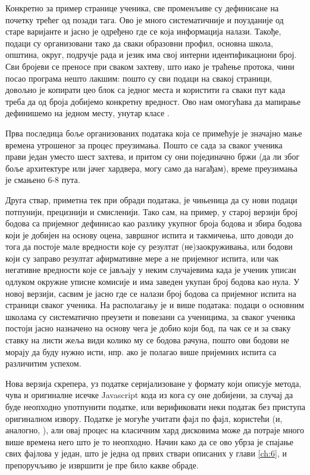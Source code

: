 Конкретно за пример странице ученика, све променљиве су дефинисане на почетку трећег од позади  тага. Ово је много систематичније и поузданије од старе варијанте и јасно је одређено где се која информација налази. Такође, подаци су организовани тако да сваки образовни профил, основна школа, општина, округ, подручје рада и језик има свој интерни идентификациони број. Сви бројеви се преносе при сваком захтеву, што иако је траћење протока, чини посао програма нешто лакшим: пошто су сви подаци на свакој страници, довољно је копирати цео блок са једног места и користити га сваки пут када треба да од броја добијемо конкретну вредност. Ово нам омогућава да мапирање дефинишемо на једном месту, унутар класе .

Прва последица боље организованих података која се примећује је значајно мање времена утрошеног за процес преузимања. Пошто се сада за сваког ученика прави један уместо шест захтева, и притом су они појединачно бржи (да ли због боље архитектуре или јачег хардвера, могу само да нагађам), време преузимања је смањено 6-8 пута. 

Друга ствар, приметна тек при обради података, је чињеница да су нови подаци потпунији, прецизнији и смисленији. Тако сам, на пример, у старој верзији број бодова са пријемног дефинисао као разлику укупног броја бодова и збира бодова који је добијен на основу оцена, завршног испита и такмичења, што доводи до тога да постоје мале вредности које су резултат (не)заокруживања, или бодови који су заправо резултат афирмативне мере а не пријемног испита, или чак негативне вредности које се јављају у неким случајевима када је ученик уписан одлуком окружне уписне комисије и има заведен укупан број бодова као нула. У новој верзији, сасвим је јасно где се налази број бодова са пријемног испита на страници сваког ученика. На располагању је и више података: подаци о основним школама су систематично преузети и повезани са ученицима, за сваког ученика постоји јасно назначено на основу чега је добио који бод, па чак се и за сваку ставку на листи жеља види колико му се бодова рачуна, пошто ови бодови не морају да буду нужно исти, нпр. ако је полагао више пријемних испита са различитим успехом.

\vspace{5mm} %

Нова верзија скрепера, уз податке серијализоване у формату који описује  метода, чува и оригиналне исечке Javascript кода из кога су оне добијени, за случај да буде неопходно употпунити податке, или верификовати неки податак без приступа оригиналном извору. Податке је могуће учитати фајл по фајл, користећи  (и, аналогно, ), али овај процес на класичним хард дисковима може да потраје много више времена него што је то неопходно. Начин како да се ово убрза је спајање свих фајлова у један, што је једна од првих ствари описаних у глави \ref{ch:6}, и препоручљиво је извршити је пре било какве обраде.



